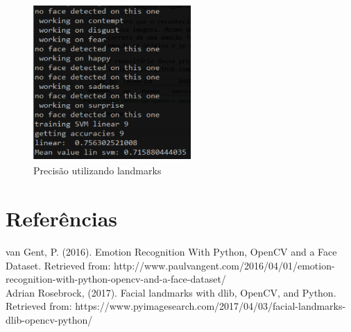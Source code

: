 \documentclass[a4paper, 12pt]{article}
\begin{document}
\begin{figure}[!ht]
  \centering
  \includegraphics[height=6cm, width=6cm]{landmarks.png}
  \caption{Precisão utilizando landmarks}
  \label{fig:landmarks}
\end{figure}

\newpage
\section{Referências}

van Gent, P. (2016). Emotion Recognition With Python, OpenCV and a Face Dataset. Retrieved from: http://www.paulvangent.com/2016/04/01/emotion-recognition-with-python-opencv-and-a-face-dataset/ \\

Adrian Rosebrock, (2017). Facial landmarks with dlib, OpenCV, and Python. Retrieved from: https://www.pyimagesearch.com/2017/04/03/facial-landmarks-dlib-opencv-python/
\end{document}
